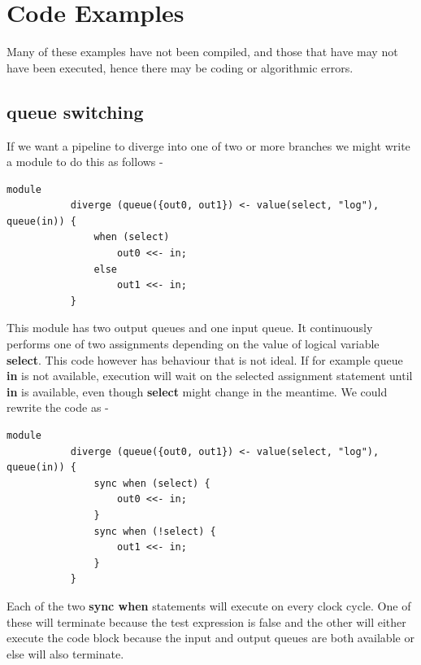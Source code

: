 \pagebreak

\chapter{Code Examples}

    Many of these examples have not been compiled, and those that have
    may not have been executed, hence there may be coding or
    algorithmic errors.

    \section{queue switching}
    
        If we want a pipeline to diverge into one of two or more branches
        we might write a module to do this as follows -
        \begin{lstlisting}[gobble=8, language=threepl]
           module
           diverge (queue({out0, out1}) <- value(select, "log"), queue(in)) {
               when (select)
                   out0 <<- in;
               else
                   out1 <<- in;
           }
        \end{lstlisting}
        This module has two output queues and one input queue. It continuously
        performs one of two assignments depending on the value of logical
        variable {\bf select}. This code however has behaviour that is not
        ideal. If for example queue {\bf in} is not available, execution will
        wait on the selected assignment statement until {\bf in} is available,
        even though {\bf select} might change in the meantime. We could rewrite
        the code as -
        \begin{lstlisting}[gobble=8, language=threepl]
           module
           diverge (queue({out0, out1}) <- value(select, "log"), queue(in)) {
               sync when (select) {
                   out0 <<- in;
               }
               sync when (!select) {
                   out1 <<- in;
               }
           }
        \end{lstlisting}
        Each of the two {\bf sync when} statements will execute on every clock
        cycle. One of these will terminate because the test expression is false
        and the other will either execute the code block because the input and
        output queues are both available or else will also terminate.
        
